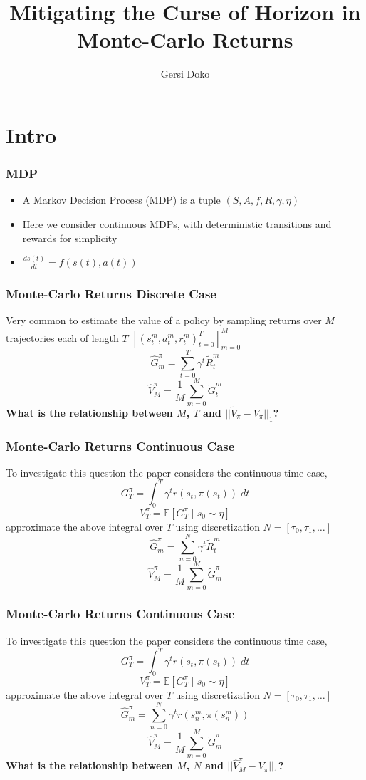 \documentclass{beamer}
\title{Mitigating the Curse of Horizon in Monte-Carlo Returns}
\author{Gersi Doko}
\institute{Department of Computer Science \\ University of New Hampshire}
\date{}
\begin{document}
\frame{\titlepage}

\section*{Intro}

\begin{frame}
\frametitle{MDP}
\begin{itemize}
  \item A Markov Decision Process (MDP) is a tuple $(S, A, f, R, \gamma, \eta)$
  \item Here we consider continuous MDPs, with deterministic transitions and rewards for simplicity
  \item $\frac{ds(t)}{dt} = f(s(t), a(t))$
\end{itemize}
\end{frame}

\begin{frame}
\frametitle{Monte-Carlo Returns Discrete Case}
  Very common to estimate the value of a policy by sampling returns over $M$ trajectories each of length $T$
  $[(s^m_t, a^m_t, r^m_t)_{t=0}^{T}]_{m=0}^{M}$
  \vfill
  $$\hat{G}_m^\pi = \sum_{t=0}^{T} \gamma^t \tilde{R}^m_{t}$$
  $$\hat{V}_M^\pi = \frac{1}{M} \sum_{m=0}^{M} \tilde{G}_t^m$$
  \vfill
  \textbf{What is the relationship between $M$, $T$ and $\lvert\lvert \tilde{V}_\pi - V_\pi \rvert\rvert_1$?}
\end{frame}

\begin{frame}
\frametitle{Monte-Carlo Returns Continuous Case}
To investigate this question the paper considers the continuous time case,
\vfill
  $$G_T^\pi = \int_{0}^{T} \gamma^t r(s_t, \pi(s_t)) \; dt$$
  $$V_T^\pi = \mathbb{E}[G^\pi_T \mid s_0 \sim \eta]$$
\vfill
approximate the above integral over $T$ using discretization $N=[\tau_0, \tau_1, \dots]$
  $$\hat{G}_m^\pi = \sum_{n=0}^{N} \gamma^t \tilde{R}^m_{t}$$
  $$\hat{V}^\pi_M = \frac{1}{M} \sum_{m=0}^{M} \tilde{G}_m^\pi$$
\end{frame}

\begin{frame}
\frametitle{Monte-Carlo Returns Continuous Case}
To investigate this question the paper considers the continuous time case,
\vfill
  $$G_T^\pi = \int_{0}^{T} \gamma^t r(s_t, \pi(s_t)) \; dt$$
  $$V_T^\pi = \mathbb{E}[G^\pi_T \mid s_0 \sim \eta]$$
\vfill
approximate the above integral over $T$ using discretization $N=[\tau_0, \tau_1, \dots]$
  $$\hat{G}_m^\pi = \sum_{n=0}^{N} \gamma^t r(s_n^m, \pi(s_n^m))$$
  $$\hat{V}^\pi_M = \frac{1}{M} \sum_{m=0}^{M} \tilde{G}_m^\pi$$
  \textbf{What is the relationship between $M$, $N$ and $\lvert\lvert \hat{V}^\pi_M - V_\pi \rvert\rvert_1$?}
\end{frame}
\end{document}
